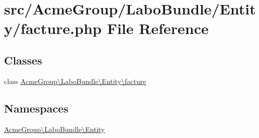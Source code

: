 \hypertarget{_labo_bundle_2_entity_2facture_8php}{\section{src/\+Acme\+Group/\+Labo\+Bundle/\+Entity/facture.php File Reference}
\label{_labo_bundle_2_entity_2facture_8php}
}
\subsection*{Classes}
\begin{DoxyCompactItemize}
\item 
class \hyperlink{class_acme_group_1_1_labo_bundle_1_1_entity_1_1facture}{Acme\+Group\textbackslash{}\+Labo\+Bundle\textbackslash{}\+Entity\textbackslash{}facture}
\end{DoxyCompactItemize}
\subsection*{Namespaces}
\begin{DoxyCompactItemize}
\item 
 \hyperlink{namespace_acme_group_1_1_labo_bundle_1_1_entity}{Acme\+Group\textbackslash{}\+Labo\+Bundle\textbackslash{}\+Entity}
\end{DoxyCompactItemize}
